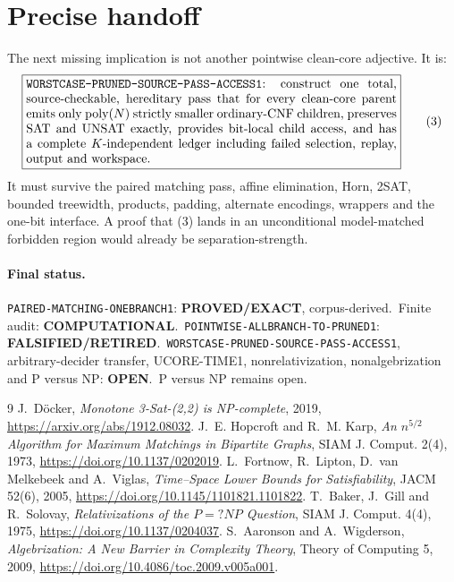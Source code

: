 \documentclass[11pt]{article}
\newcommand{\EXACT}{\textbf{PROVED/EXACT}}
\newcommand{\COMP}{\textbf{COMPUTATIONAL}}
\newcommand{\OPEN}{\textbf{OPEN}}
\newcommand{\RETIRED}{\textbf{FALSIFIED/RETIRED}}
\begin{document}
\section{Precise handoff}

The next missing implication is not another pointwise clean-core adjective.
It is:
\[
 \boxed{
 \begin{minipage}{0.86\linewidth}
 \texttt{WORSTCASE-PRUNED-SOURCE-PASS-ACCESS1}: construct one total,
source-checkable, hereditary pass that for every clean-core parent emits only
$\operatorname{poly}(N)$ strictly smaller ordinary-CNF children, preserves
SAT and UNSAT exactly, provides bit-local child access, and has a complete
$K$-independent ledger including failed selection, replay, output and
workspace.
 \end{minipage}}
 \tag{3}
\]
It must survive the paired matching pass, affine elimination, Horn, 2SAT,
bounded treewidth, products, padding, alternate encodings, wrappers and the
one-bit interface.  A proof that (3) lands in an unconditional
model-matched forbidden region would already be separation-strength.

\paragraph{Final status.}
\texttt{PAIRED-MATCHING-ONEBRANCH1}: \EXACT, corpus-derived.\
Finite audit: \COMP.\
\texttt{POINTWISE-ALLBRANCH-TO-PRUNED1}: \RETIRED.\
\texttt{WORSTCASE-PRUNED-SOURCE-PASS-ACCESS1}, arbitrary-decider transfer,
UCORE-TIME1, nonrelativization, nonalgebrization and P versus NP: \OPEN.\
P versus NP remains open.

\begin{thebibliography}{9}
\bibitem{Doecker}
J.~Döcker, \emph{Monotone 3-Sat-(2,2) is NP-complete}, 2019,
\url{https://arxiv.org/abs/1912.08032}.
\bibitem{HopcroftKarp}
J.~E. Hopcroft and R.~M. Karp,
\emph{An $n^{5/2}$ Algorithm for Maximum Matchings in Bipartite Graphs},
SIAM J. Comput. 2(4), 1973,
\url{https://doi.org/10.1137/0202019}.
\bibitem{FLMV}
L.~Fortnow, R.~Lipton, D.~van Melkebeek and A.~Viglas,
\emph{Time--Space Lower Bounds for Satisfiability}, JACM 52(6), 2005,
\url{https://doi.org/10.1145/1101821.1101822}.
\bibitem{BGS}
T.~Baker, J.~Gill and R.~Solovay,
\emph{Relativizations of the $P=?NP$ Question}, SIAM J. Comput. 4(4), 1975,
\url{https://doi.org/10.1137/0204037}.
\bibitem{AW}
S.~Aaronson and A.~Wigderson,
\emph{Algebrization: A New Barrier in Complexity Theory},
Theory of Computing 5, 2009,
\url{https://doi.org/10.4086/toc.2009.v005a001}.
\end{thebibliography}

\end{document}
